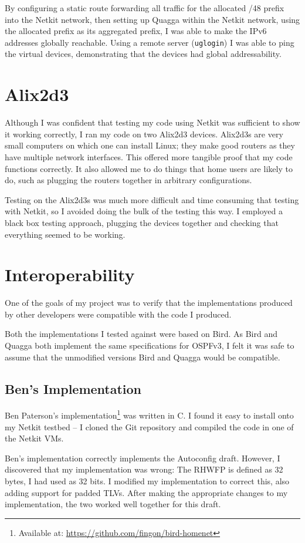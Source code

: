 By configuring a static route forwarding all traffic for the allocated /48
prefix into the Netkit network, then setting up Quagga within the Netkit
network, using the allocated prefix as its aggregated prefix, I was able to
make the IPv6 addresses globally reachable. Using a remote server
(\texttt{uglogin}) I was able to ping the virtual devices, demonstrating that
the devices had global addressability.

\section{Alix2d3}
\label{alix}
Although I was confident that testing my code using Netkit was sufficient to
show it working correctly, I ran my code on two Alix2d3 devices. Alix2d3s are
very small computers on which one can install Linux; they make good routers as
they have multiple network interfaces. This offered more tangible proof
that my code functions correctly. It also allowed me to do things that home
users are likely to do, such as plugging the routers together in arbitrary
configurations.

Testing on the Alix2d3s was much more difficult and time consuming that testing
with Netkit, so I avoided doing the bulk of the testing this way. I employed a
black box testing approach, plugging the devices together and checking that
everything seemed to be working. 

\section{Interoperability}
One of the goals of my project was to verify that the implementations produced
by other developers were compatible with the code I produced. 

Both the implementations I tested against were based on Bird. As Bird and
Quagga both implement the same specifications for OSPFv3, I felt it was safe to
assume that the unmodified versions Bird and Quagga would be compatible. 

\subsection{Ben's Implementation}
Ben Paterson's implementation\footnote{Available at:
\url{https://github.com/fingon/bird-homenet}} was written in C. I found it
easy to install onto my Netkit testbed -- I cloned the Git repository and
compiled the code in one of the Netkit VMs. 

Ben's implementation correctly implements the Autoconfig draft. However, I
discovered that my implementation was wrong: The RHWFP is defined as 32 bytes,
I had used as 32 bits. I modified my implementation to correct this, also
adding support for padded TLVs. After making the appropriate changes to my
implementation, the two worked well together for this draft.

